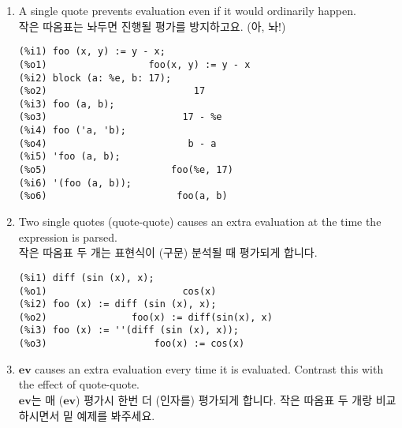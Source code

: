 \documentclass[12pt]{article}
\begin{document}
\begin{enumerate}
\begin{verbatim}
(%i1) block (a: 1, b: %pi, c: x + y);
(%o1)                         y + x
(%i2) [a, b, c];
(%o2)                    [1, %pi, y + x]
(%i3) save ("tmp.save", a, b, c);
(%o3)                       tmp.save
(%i4) f (a) := a^b;
                                    b
(%o4)                      f(a) := a
(%i5) f (7);
                               %pi
(%o5)                         7
(%i6) kill (a, b, c);
(%o6)                         done
(%i7) [a, b, c];
(%o7)                       [a, b, c]
\end{verbatim}

\item A single quote prevents evaluation even if it would ordinarily happen. \\
작은 따옴표는 놔두면 진행될 평가를 방지하고요. (아, 놔!)

\begin{verbatim}
(%i1) foo (x, y) := y - x;
(%o1)                  foo(x, y) := y - x
(%i2) block (a: %e, b: 17);
(%o2)                          17
(%i3) foo (a, b);
(%o3)                        17 - %e
(%i4) foo ('a, 'b);
(%o4)                         b - a
(%i5) 'foo (a, b);
(%o5)                      foo(%e, 17)
(%i6) '(foo (a, b));
(%o6)                       foo(a, b)
\end{verbatim}

\item Two single quotes (quote-quote) causes an extra evaluation at the time the expression is parsed. \\
작은 따옴표 두 개는 표현식이 (구문) 분석될 때 평가되게 합니다. 

\begin{verbatim}
(%i1) diff (sin (x), x);
(%o1)                        cos(x)
(%i2) foo (x) := diff (sin (x), x);
(%o2)               foo(x) := diff(sin(x), x)
(%i3) foo (x) := ''(diff (sin (x), x));
(%o3)                   foo(x) := cos(x)
\end{verbatim}

\item $\mathbf{ev}$ causes an extra evaluation every time it is evaluated.
Contrast this with the effect of quote-quote. \\
$\mathbf{ev}$는 매 ($\mathbf{ev}$) 평가시 한번 더 (인자를) 평가되게 합니다. 작은 따옴표 두 개랑 비교하시면서 밑 예제를 봐주세요.


\end{enumerate}
\end{document}
